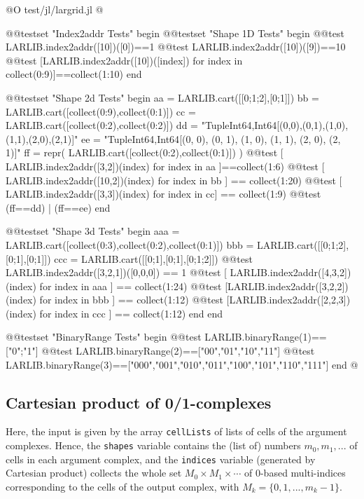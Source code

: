 @O test/jl/largrid.jl
@{
@@testset "Index2addr Tests" begin
   @@testset "Shape 1D Tests" begin
      @@test LARLIB.index2addr([10])([0])==1
      @@test LARLIB.index2addr([10])([9])==10
      @@test [LARLIB.index2addr([10])([index]) for index in collect(0:9)]==collect(1:10)
   end

   @@testset "Shape 2d Tests" begin
      aa = LARLIB.cart([[0;1;2],[0;1]])
      bb = LARLIB.cart([collect(0:9),collect(0:1)])
      cc = LARLIB.cart([collect(0:2),collect(0:2)])
      dd = "Tuple{Int64,Int64}[(0,0),(0,1),(1,0),(1,1),(2,0),(2,1)]"
      ee = "Tuple{Int64,Int64}[(0, 0), (0, 1), (1, 0), (1, 1), (2, 0), (2, 1)]"
      ff = repr( LARLIB.cart([collect(0:2),collect(0:1)]) )
      @@test [ LARLIB.index2addr([3,2])(index) for index in aa ]==collect(1:6)
      @@test [ LARLIB.index2addr([10,2])(index) for index in bb ] == collect(1:20)
      @@test [ LARLIB.index2addr([3,3])(index) for index in cc] == collect(1:9)
      @@test (ff==dd) | (ff==ee)
   end

   @@testset "Shape 3d Tests" begin
      aaa = LARLIB.cart([collect(0:3),collect(0:2),collect(0:1)])
      bbb = LARLIB.cart([[0;1;2],[0;1],[0;1]])
      ccc = LARLIB.cart([[0;1],[0;1],[0;1;2]])
      @@test LARLIB.index2addr([3,2,1])([0,0,0]) == 1
      @@test [ LARLIB.index2addr([4,3,2])(index) for index in aaa ] == collect(1:24)
      @@test [LARLIB.index2addr([3,2,2])(index) for index in bbb ] == collect(1:12)
      @@test [LARLIB.index2addr([2,2,3])(index) for index in ccc ] == collect(1:12)
   end
end

@@testset "BinaryRange Tests" begin
   @@test LARLIB.binaryRange(1)==["0";"1"]
   @@test LARLIB.binaryRange(2)==["00","01","10","11"]
   @@test LARLIB.binaryRange(3)==["000","001","010","011","100","101","110","111"]
end
@}



\subsection{Cartesian product of 0/1-complexes}
Here, the input is given by the array \texttt{cellLists} of lists of cells of the argument complexes. Hence, the \texttt{shapes} variable contains the (list of) numbers $m_0, m_1, ...$ of cells in each argument complex, and the \texttt{indices} variable (generated by Cartesian product) collects the whole set $M_0 \times M_1 \times \cdots$ of 0-based multi-indices corresponding to the cells of the output complex, with $M_k = \{0,1,...,m_{k}-1\}$.

